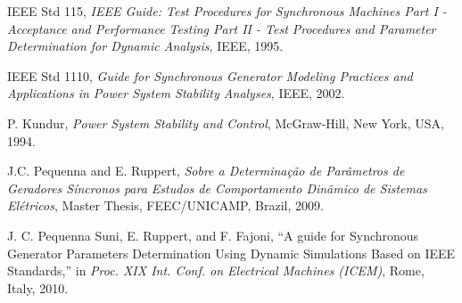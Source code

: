 \documentclass[conference]{IEEEtran}
\begin{document}
\begin{thebibliography}{plain}

IEEE Std 115, \emph{IEEE Guide: Test Procedures for Synchronous Machines Part I - Acceptance and Performance Testing Part II - Test Procedures and Parameter Determination for Dynamic Analysis}, IEEE, 1995.

IEEE Std 1110, \emph{Guide for Synchronous Generator Modeling Practices and Applications in Power System Stability Analyses}, IEEE, 2002.

P. Kundur, \emph{Power System Stability and Control}, McGraw-Hill, New York, USA, 1994.

J.C. Pequenna and E. Ruppert, \emph{Sobre a Determina\c{c}\~ao de Par\^ametros de Geradores S\'incronos para Estudos de Comportamento Din\^amico de Sistemas El\'etricos}, Master Thesis, FEEC/UNICAMP, Brazil, 2009.

J. C. Pequenna Suni, E. Ruppert, and F. Fajoni, ``A guide for Synchronous Generator Parameters Determination Using Dynamic Simulations Based on IEEE Standards,'' in \emph{Proc. XIX Int. Conf. on Electrical Machines (ICEM)}, Rome, Italy, 2010.

\end{thebibliography}
\end{document}
